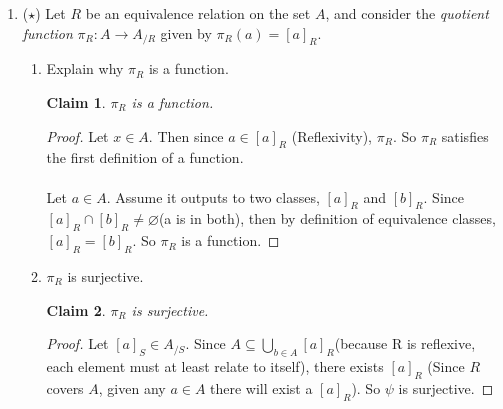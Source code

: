 \documentclass[11pt]{letter}
\newtheorem{claim}{Claim}
\theoremstyle{definition}
\begin{document}
\begin{description}
\begin{enumerate}
		
		\item ($\star$) Let $R$ be an equivalence relation on the set $A$, and consider the {\em quotient function} $\pi_R: A\rightarrow A_{/R}$ given by $\pi_R(a)=[a]_R$.
			\begin{enumerate}
                        \item Explain why $\pi_R$ is a function.
                          \begin{claim}
                            $\pi_R$ is a function.
                          \end{claim}
                          \begin{proof}
                            Let $x\in A$. Then since $a\in [a]_R$ (Reflexivity), $\pi_R$. So $\pi_R$ satisfies the first definition of a function.\\ \\
  Let $a\in A$. Assume it outputs to two classes, $[a]_R$ and $[b]_R$. Since $[a]_R\cap[b]_R\neq\varnothing$(a is in both), then by definition of equivalence classes, $[a]_R=[b]_R$. So $\pi_R$ is a function.
                          \end{proof}
                          
                        \item $\pi_R$ is surjective.
                          \begin{claim}
                            $\pi_R$ is surjective.
                          \end{claim}
                          \begin{proof}
                            Let $[a]_S\in A_{/S}$. Since $A\subseteq \bigcup_{b\in A}[a]_R$(because R is reflexive, each element must at least relate to itself), there exists $[a]_R$ (Since $R$ covers $A$, given any $a\in A$ there will exist a $[a]_R$). So $\psi$ is surjective. 
                          \end{proof}
                          

\end{enumerate}
\end{enumerate}
\end{description}
\end{document}
